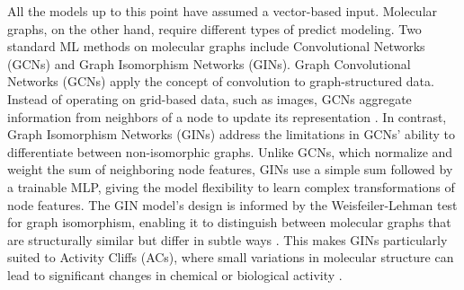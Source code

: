 All the models up to this point have assumed a vector-based input. Molecular graphs, on the other hand, require different types of predict modeling. Two standard ML methods on molecular graphs include Convolutional Networks (GCNs) and Graph Isomorphism Networks (GINs). Graph Convolutional Networks (GCNs) apply the concept of convolution to graph-structured data. Instead of operating on grid-based data, such as images, GCNs aggregate information from neighbors of a node to update its representation \citep{TeachOpenCADD2023, Xu2019}. In contrast, Graph Isomorphism Networks (GINs) address the limitations in GCNs’ ability to differentiate between non-isomorphic graphs. Unlike GCNs, which normalize and weight the sum of neighboring node features, GINs use a simple sum followed by a trainable MLP, giving the model flexibility to learn complex transformations of node features. The GIN model’s design is informed by the Weisfeiler-Lehman test for graph isomorphism, enabling it to distinguish between molecular graphs that are structurally similar but differ in subtle ways \citep{TeachOpenCADD2023, Xu2019}. This makes GINs particularly suited to Activity Cliffs (ACs), where small variations in molecular structure can lead to significant changes in chemical or biological activity \citep{TeachOpenCADD2023}. 


